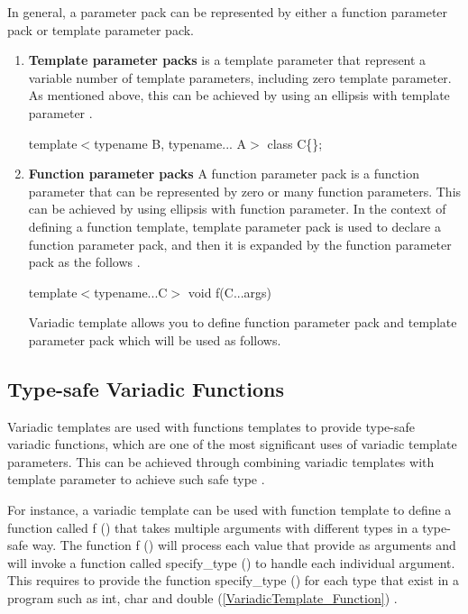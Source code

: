 \documentclass[11pt]{report}
\begin{document}
In general, a parameter pack can be represented by either a function parameter pack or template parameter pack.

\begin{enumerate}
\item \textbf{Template parameter packs} is a template parameter that represent a variable number of template parameters, including zero template parameter.  As mentioned above, this can be achieved by using an ellipsis with template parameter \cite{Gregorie:professionalcpp}.
\begin{center}
template$<$typename B, typename... A$>$ class C\{\}; 
\end{center}


\item \textbf{Function parameter packs} A function parameter pack is a function parameter that can be represented by zero or many function parameters. This can be achieved by using ellipsis with function parameter. In the context of defining a function template, template parameter pack is used to declare a function parameter pack, and then it is expanded by the function parameter pack as the follows \cite{Gregorie:professionalcpp}.
\begin{center}
template$<$typename...C$>$ void f(C...args)
\end{center}

Variadic template allows you to define function parameter pack and template parameter pack which will be used as follows.

\end{enumerate}

\subsection{Type-safe Variadic Functions}
Variadic templates are used with functions templates to provide type-safe variadic functions, which are one of the most significant uses of variadic template parameters. This can be achieved through combining variadic templates with template parameter to achieve such safe type \cite{Gregor:2007:VTC}.


For instance, a variadic template can be used with function template to define a function called f () that takes multiple arguments with different types in a type-safe way. The function f () will process each value that provide as arguments and will invoke a function called specify\_type () to handle each individual argument. This requires to provide the function specify\_type () for each type that exist in a program such as int, char and double (\ref{VariadicTemplate_Function}) \cite{Gregorie:professionalcpp}.
\end{document}
